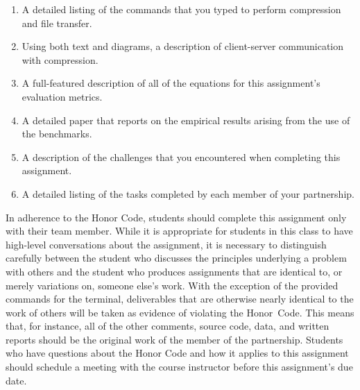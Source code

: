 \begin{enumerate}

    \item A detailed listing of the commands that you typed to perform compression and file transfer.

    \item Using both text and diagrams, a description of client-server communication with compression.

    \item A full-featured description of all of the equations for this assignment's evaluation metrics.

    \item A detailed paper that reports on the empirical results arising from the use of the benchmarks.

    \item A description of the challenges that you encountered when completing this assignment.

    \item A detailed listing of the tasks completed by each member of your partnership.

\end{enumerate}

In adherence to the Honor Code, students should complete this assignment only with their team member. While it is
appropriate for students in this class to have high-level conversations about the assignment, it is necessary to
distinguish carefully between the student who discusses the principles underlying a problem with others and the student
who produces assignments that are identical to, or merely variations on, someone else's work.  With the exception of the
provided commands for the terminal, deliverables that are otherwise nearly identical to the work of others will be taken
as evidence of violating the \mbox{Honor Code}. This means that, for instance, all of the other comments, source code,
data, and written reports should be the original work of the member of the partnership. Students who have questions
about the Honor Code and how it applies to this assignment should schedule a meeting with the course instructor before
this assignment's due date.


